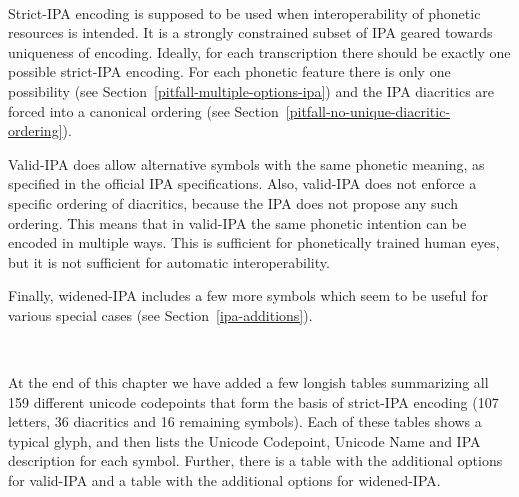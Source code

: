 \ 

\noindent Strict-IPA encoding is supposed to be used when interoperability of
phonetic resources is intended. It is a strongly constrained subset of IPA
geared towards uniqueness of encoding. Ideally, for each transcription there
should be exactly one possible strict-IPA encoding. For each phonetic feature
there is only one possibility (see Section~\ref{pitfall-multiple-options-ipa})
and the IPA diacritics are forced into a canonical ordering (see
Section~\ref{pitfall-no-unique-diacritic-ordering}).

Valid-IPA does allow alternative symbols with the same phonetic meaning, as 
specified in the official IPA specifications. Also, valid-IPA does not enforce a 
specific ordering of diacritics, because the IPA does not propose any such 
ordering. This means that in valid-IPA the same phonetic intention can be 
encoded in multiple ways. This is sufficient for phonetically trained human 
eyes, but it is not sufficient for automatic interoperability.

Finally, widened-IPA includes a few more symbols which seem to be useful for
various special cases (see Section~\ref{ipa-additions}).

\ 

\noindent At the end of this chapter we have added a few longish tables summarizing all
159 different unicode codepoints that form the basis of strict-IPA encoding
(107 letters, 36 diacritics and 16 remaining symbols). Each of
these tables shows a typical glyph, and then lists the Unicode Codepoint,
Unicode Name and IPA description for each symbol. Further, there is a table with 
the additional options for valid-IPA and a table with the additional options for 
widened-IPA.\@

